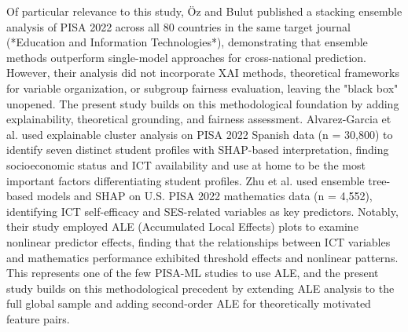 \documentclass[pdflatex,sn-mathphys-ay]{sn-jnl}
\begin{document}
Of particular relevance to this study, Öz and Bulut \citep{Oz_Bulut_2025_stacking} published a stacking ensemble analysis of PISA 2022 across all 80 countries in the same target journal (*Education and Information Technologies*), demonstrating that ensemble methods outperform single-model approaches for cross-national prediction. However, their analysis did not incorporate XAI methods, theoretical frameworks for variable organization, or subgroup fairness evaluation, leaving the "black box" unopened. The present study builds on this methodological foundation by adding explainability, theoretical grounding, and fairness assessment. Alvarez-Garcia et al. \citep{Alvarez_Garcia_2024_clusters} used explainable cluster analysis on PISA 2022 Spanish data (n = 30,800) to identify seven distinct student profiles with SHAP-based interpretation, finding socioeconomic status and ICT availability and use at home to be the most important factors differentiating student profiles. Zhu et al. \citep{Zhu_2025_US_PISA} used ensemble tree-based models and SHAP on U.S. PISA 2022 mathematics data (n = 4,552), identifying ICT self-efficacy and SES-related variables as key predictors. Notably, their study employed ALE (Accumulated Local Effects) plots to examine nonlinear predictor effects, finding that the relationships between ICT variables and mathematics performance exhibited threshold effects and nonlinear patterns. This represents one of the few PISA-ML studies to use ALE, and the present study builds on this methodological precedent by extending ALE analysis to the full global sample and adding second-order ALE for theoretically motivated feature pairs.
\end{document}
